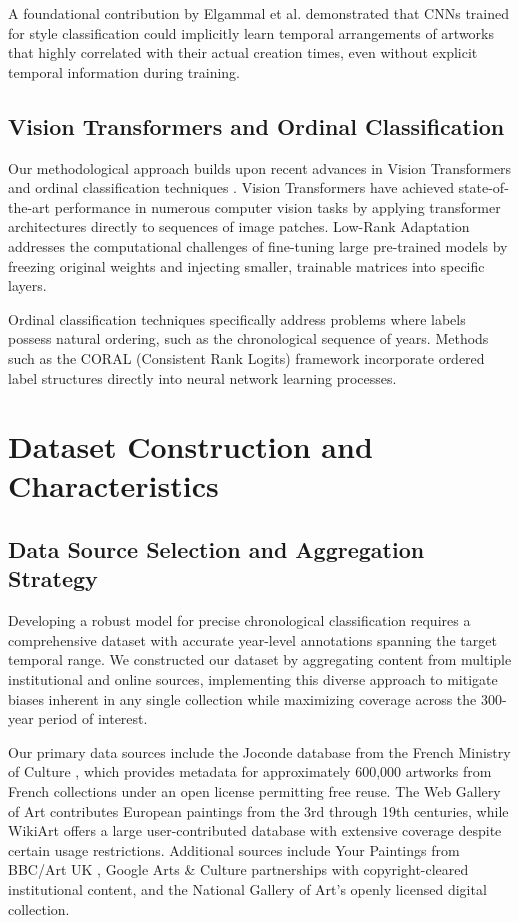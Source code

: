 \documentclass[10pt,twocolumn,letterpaper]{article}
\begin{document}
A foundational contribution by Elgammal et al. \cite{Elgammal18} demonstrated that CNNs trained for style classification could implicitly learn temporal arrangements of artworks that highly correlated with their actual creation times, even without explicit temporal information during training.

\subsection{Vision Transformers and Ordinal Classification}

Our methodological approach builds upon recent advances in Vision Transformers \cite{Dosovitskiy20ViT} and ordinal classification techniques \cite{Cheng08Ordinal, Cao20Ordinal}. Vision Transformers have achieved state-of-the-art performance in numerous computer vision tasks by applying transformer architectures directly to sequences of image patches. Low-Rank Adaptation \cite{Hu21LoRA} addresses the computational challenges of fine-tuning large pre-trained models by freezing original weights and injecting smaller, trainable matrices into specific layers.

Ordinal classification techniques specifically address problems where labels possess natural ordering, such as the chronological sequence of years. Methods such as the CORAL (Consistent Rank Logits) framework \cite{Cao20Ordinal} incorporate ordered label structures directly into neural network learning processes.

\section{Dataset Construction and Characteristics}

\subsection{Data Source Selection and Aggregation Strategy}

Developing a robust model for precise chronological classification requires a comprehensive dataset with accurate year-level annotations spanning the target temporal range. We constructed our dataset by aggregating content from multiple institutional and online sources, implementing this diverse approach to mitigate biases inherent in any single collection while maximizing coverage across the 300-year period of interest.

Our primary data sources include the Joconde database from the French Ministry of Culture \cite{JocondeTerms}, which provides metadata for approximately 600,000 artworks from French collections under an open license permitting free reuse. The Web Gallery of Art \cite{WGATerms} contributes European paintings from the 3rd through 19th centuries, while WikiArt \cite{WikiArtTerms} offers a large user-contributed database with extensive coverage despite certain usage restrictions. Additional sources include Your Paintings from BBC/Art UK \cite{ArtUKTerms}, Google Arts \& Culture \cite{GoogleArtsCultureTerms} partnerships with copyright-cleared institutional content, and the National Gallery of Art's openly licensed digital collection.
\end{document}
